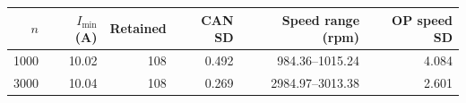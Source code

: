 \begin{tabular}{rrrrrr}
\toprule
$n$ & $I_{\min}$ (A) & Retained & CAN SD & Speed range (rpm) & OP speed SD\\
\midrule
1000 & 10.02 & 108 & 0.492 & 984.36--1015.24 & 4.084\\
3000 & 10.04 & 108 & 0.269 & 2984.97--3013.38 & 2.601\\
\bottomrule
\end{tabular}
